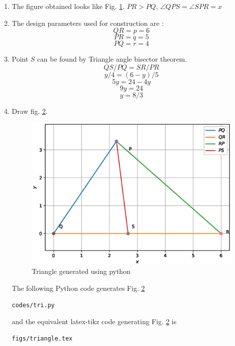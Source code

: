 \renewcommand{\theequation}{\theenumi}
\begin{enumerate}[label=\thesection.\arabic*.,ref=\thesection.\theenumi]

\begin{figure}[!ht]
\centering
\resizebox{\columnwidth}{!}{}
\caption{Quadilateral by Latex-Tikz}
\label{fig:triangle1}	
\end{figure}

\item The figure obtained looks like Fig. \ref{fig:triangle1}.
$PR > PQ$, $\angle{QPS}=\angle{SPR}=x$

\item The design parameters used for construction are :
$$QR = p = 6$$
$$PR = q = 5$$
$$PQ = r = 4$$

\item Point $S$ can be found by Triangle angle bisector theorem.
$$QS/PQ = SR/PR$$
$$y/4 = (6-y)/5$$
$$5y = 24 - 4y$$
$$9y = 24$$
$$y = 8/3$$

\item Draw fig. \ref{fig:triangle2}.

\begin{figure}[!ht]
\centering
\includegraphics[width=\columnwidth]{./codes/tri.eps}
\caption{Triangle generated using python}
\label{fig:triangle2}
\end{figure} 

\solution The  following Python code generates Fig. \ref{fig:triangle2}

\begin{lstlisting}
codes/tri.py
\end{lstlisting}

and the equivalent latex-tikz code generating Fig. \ref{fig:triangle2} is 
\begin{lstlisting}
figs/triangle.tex
\end{lstlisting}
%
\end{enumerate}
  

